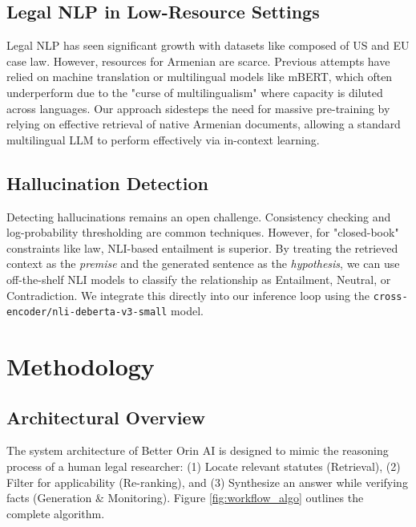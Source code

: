\documentclass[11pt]{article}
\begin{document}
\subsection{Legal NLP in Low-Resource Settings}
Legal NLP has seen significant growth with datasets like composed of US and EU case law. However, resources for Armenian are scarce. Previous attempts have relied on machine translation or multilingual models like mBERT, which often underperform due to the "curse of multilingualism" where capacity is diluted across languages. Our approach sidesteps the need for massive pre-training by relying on effective retrieval of native Armenian documents, allowing a standard multilingual LLM to perform effectively via in-context learning.

\subsection{Hallucination Detection}
Detecting hallucinations remains an open challenge. Consistency checking \citep{manakul2023selfcheckgpt} and log-probability thresholding are common techniques. However, for "closed-book" constraints like law, NLI-based entailment is superior. By treating the retrieved context as the \textit{premise} and the generated sentence as the \textit{hypothesis}, we can use off-the-shelf NLI models to classify the relationship as Entailment, Neutral, or Contradiction. We integrate this directly into our inference loop using the \texttt{cross-encoder/nli-deberta-v3-small} model.

\section{Methodology}

\subsection{Architectural Overview}
The system architecture of Better Orin AI is designed to mimic the reasoning process of a human legal researcher: (1) Locate relevant statutes (Retrieval), (2) Filter for applicability (Re-ranking), and (3) Synthesize an answer while verifying facts (Generation \& Monitoring). Figure \ref{fig:workflow_algo} outlines the complete algorithm.
\end{document}
